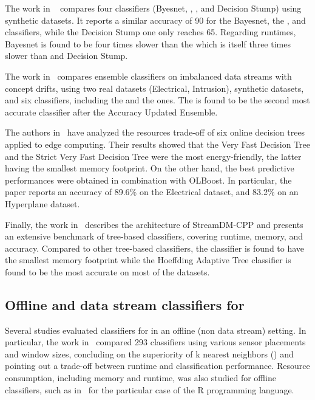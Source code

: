 The work in ~\cite{kaur2020} compares four classifiers (Byesnet,
\hoeffdingtree, \naivebayes, and Decision Stump) using synthetic datasets.
It reports a similar accuracy of 90 for the Bayesnet, the
\hoeffdingtree, and \naivebayes classifiers, while the Decision Stump one
only reaches 65. Regarding runtimes, Bayesnet is found to be four times
slower than the \hoeffdingtree which is itself three times slower than
\naivebayes and Decision Stump.

The work in~\cite{priya2020comprehensive} compares ensemble classifiers on
imbalanced data streams with concept drifts, using two real datasets
(Electrical, Intrusion), synthetic datasets, and six classifiers, including the
\naivebayes and the \hoeffdingtree ones. The \hoeffdingtree is found to be
the second most accurate classifier after the Accuracy Updated Ensemble.

The authors in~\cite{lopes2020evaluating} have analyzed the resources trade-off
of six online decision trees applied to edge computing. Their results showed that the
Very Fast Decision Tree and the Strict Very Fast Decision Tree were the most
energy-friendly, the latter having the smallest memory footprint. On the
other hand, the best predictive performances were obtained in combination with
OLBoost. In particular, the paper reports an accuracy of 89.6\% on the Electrical
dataset, and 83.2\% on an Hyperplane dataset.

Finally, the work in~\cite{StreamDM-CPP} describes the architecture of
StreamDM-CPP and presents an extensive benchmark of tree-based classifiers,
covering runtime, memory, and accuracy. Compared to other tree-based
classifiers, the \hoeffdingtree classifier is found to have the smallest
memory footprint while the Hoeffding Adaptive Tree classifier is found to be
the most accurate on most of the datasets. 

\subsection{Offline and data stream classifiers for \har}

Several studies evaluated classifiers for \har in an offline (non data stream)
setting. In particular, the work in~\cite{Janidarmian_2017} compared 293
classifiers using various sensor placements and window sizes, concluding on the
superiority of k nearest neighbors (\knn) and pointing out a trade-off between
runtime and classification performance. Resource consumption, including memory
and runtime, was also studied for offline classifiers, such as
in~\cite{memory_consumption_machine_learning} for the particular case of the R
programming language.

